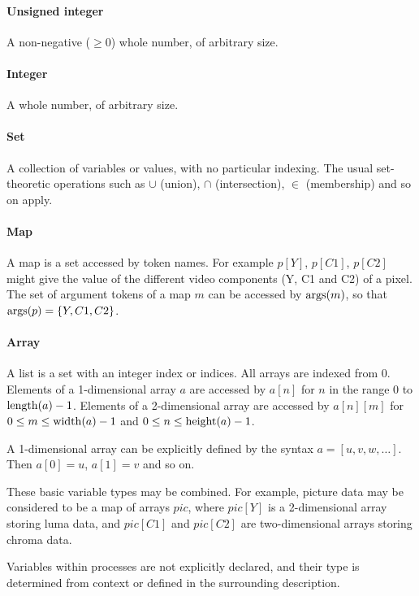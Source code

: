 \paragraph*{Unsigned integer} A non-negative ($\geq 0$) whole number, of arbitrary size.

\paragraph*{Integer} A whole number, of arbitrary size.

\paragraph*{Set} A collection of variables or values, with no particular indexing. The usual
set-theoretic operations such as $\cup$ (union), $\cap$ (intersection), $\in$ (membership)
and so on apply.

\paragraph*{Map}

A map is a set accessed by token names. For example
$p[Y]$, $p[C1]$, $p[C2]$ might give the value of the different video components
(Y, C1 and C2) of a pixel. The set of argument tokens of a map $m$ can be accessed by $\operatorname{args}(m)$,
so that $\operatorname{args}(p)=\{Y,C1,C2\}$.

\paragraph*{Array} 

A list is a set with an integer index or indices. All arrays are indexed from 0. 
Elements of a 1-dimensional array $a$ are accessed by $a[n]$ for $n$ in the
range 0 to $\operatorname{length}(a)-1$. Elements of a 2-dimensional array are accessed by
$a[n][m]$ for $0\leq m\leq\operatorname{width}(a)-1$ and $0\leq n\leq\operatorname{height}(a)-1$.

A 1-dimensional array can be explicitly defined by the syntax $a=[u, v, w, \hdots]$.
Then $a[0]=u$, 
$a[1]=v$ and so on.

These basic variable types may be combined. For example, picture data may be considered
to be a map of arrays $pic$, where $pic[Y]$ is a 2-dimensional array storing luma data,
and $pic[C1]$ and $pic[C2]$ are two-dimensional arrays storing chroma data.

Variables within processes are not explicitly declared, and their type is determined from
context or defined in the surrounding description.

